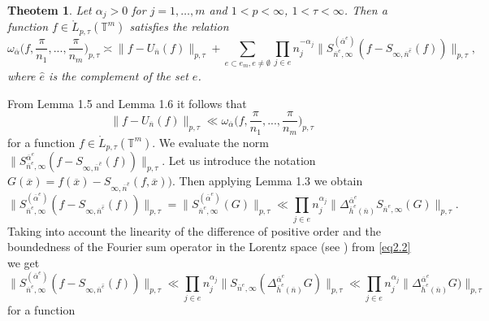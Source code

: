 \documentclass[12pt]{article}
\theoremstyle{plain}
\newtheorem{theorem}{Theotem}[section]
\begin{document}
\begin{theorem}\label{th1.1} Let $\alpha_{j}> 0$ for $j=1, \ldots , m$ and $1< p<\infty$, $1< \tau < \infty$. Then a function $f\in {\mathring L}_{p, \tau}(\mathbb{T}^{m})$ satisfies the relation
 \begin{equation*}
 \omega_{\overline\alpha}\bigl(f,\frac{\pi}{n_{1}},...,\frac{\pi}{n_{m}}\bigr)_{p, \tau} \asymp 
\|f - U_{\overline{n}} (f)\|_{p, \tau} + \sum_{e\subset e_{m}, e\neq \emptyset} \prod_{j\in e}n_{j}^{-\alpha_{j}} \|S_{\overline{n}^{e}, \infty}^{(\overline{\alpha}^{e})}(f-S_{\infty, \overline{n}^{\hat{e}}}(f))\|_{p, \tau},
  \end{equation*}
where $\hat{e}$ is the complement of the set $e$. 
\end{theorem}
\proof
From Lemma 1.5 and Lemma 1.6 it follows that  
 \begin{equation}\label{eq2.1}
 \|f - U_{\overline{n}} (f)\|_{p, \tau}\ll  \omega_{\overline\alpha}\bigl(f,\frac{\pi}{n_{1}},...,\frac{\pi}{n_{m}}\bigr)_{p, \tau}
\end{equation}
for a function 
 $f\in {\mathring L}_{p, \tau}(\mathbb{T}^{m})$.
We evaluate the norm 
  $\|S_{\overline{n}^{e}, \infty}^{\overline{\alpha}^{e}}(f-S_{\infty, \overline{n}^{\hat{e}}}(f))\|_{p, \tau}$. Let us introduce the notation 
   $G(\overline{x})=f(\overline{x})-S_{\infty, \overline{n}^{\hat{e}}}(f, \overline{x}))$. Then applying Lemma 1.3 we obtain 
 \begin{equation}\label{eq2.2}
 \|S_{\overline{n}^{e}, \infty}^{(\overline{\alpha}^{e})}(f-S_{\infty, \overline{n}^{\hat{e}}}(f))\|_{p, \tau}= \|S_{\overline{n}^{e}, \infty}^{(\overline{\alpha}^{e})}(G)\|_{p, \tau}\ll \prod_{j\in e}n_{j}^{\alpha_{j}}\|\Delta_{\overline{h}^{e}(\overline{n})}^{\overline{\alpha}^{e}} S_{\overline{n}^{e}, \infty}(G)\|_{p, \tau}.  
\end{equation}
Taking into account the linearity of the difference of positive order and the boundedness of the Fourier sum operator in the Lorentz space (see \cite{4}) from \eqref{eq2.2} we get
 \begin{equation}\label{eq2.3}
\|S_{\overline{n}^{e}, \infty}^{(\overline{\alpha}^{e})}(f-S_{\infty, \overline{n}^{\hat{e}}}(f))\|_{p, \tau} \ll \prod_{j\in e}n_{j}^{\alpha_{j}}\|S_{\overline{n}^{e}, \infty}(\Delta_{\overline{h}^{e}(\overline{n})}^{\overline{\alpha}^{e}}G) \|_{p, \tau}\ll \prod_{j\in e}n_{j}^{\alpha_{j}}\|\Delta_{\overline{h}^{e}(\overline{n})}^{\overline{\alpha}^{e}}G) \|_{p, \tau}
\end{equation}
for a function %
\end{document}
